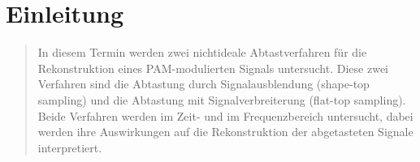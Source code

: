 \section{Einleitung}
\begin{quote}
	In diesem Termin werden zwei nichtideale Abtastverfahren für die
	Rekonstruktion eines PAM-modulierten Signals untersucht. Diese zwei Verfahren
	sind die Abtastung durch Signalausblendung (shape-top sampling) und die
	Abtastung mit Signalverbreiterung (flat-top sampling). Beide Verfahren werden
	im Zeit- und im Frequenzbereich untersucht, dabei werden ihre Auswirkungen auf
	die Rekonstruktion der abgetasteten Signale interpretiert.
\end{quote}%


